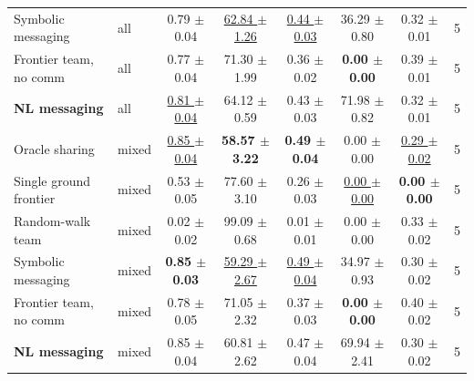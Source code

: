 \begin{tabular}{llcccccc}
Symbolic messaging & all & 0.79 $\pm$ 0.04 & \underline{62.84 $\pm$ 1.26} & \underline{0.44 $\pm$ 0.03} & 36.29 $\pm$ 0.80 & 0.32 $\pm$ 0.01 & 5 \\
Frontier team, no comm & all & 0.77 $\pm$ 0.04 & 71.30 $\pm$ 1.99 & 0.36 $\pm$ 0.02 & \textbf{0.00 $\pm$ 0.00} & 0.39 $\pm$ 0.01 & 5 \\
\textbf{NL messaging} & all & \underline{0.81 $\pm$ 0.04} & 64.12 $\pm$ 0.59 & 0.43 $\pm$ 0.03 & 71.98 $\pm$ 0.82 & 0.32 $\pm$ 0.01 & 5 \\
\midrule
Oracle sharing & mixed & \underline{0.85 $\pm$ 0.04} & \textbf{58.57 $\pm$ 3.22} & \textbf{0.49 $\pm$ 0.04} & 0.00 $\pm$ 0.00 & \underline{0.29 $\pm$ 0.02} & 5 \\
Single ground frontier & mixed & 0.53 $\pm$ 0.05 & 77.60 $\pm$ 3.10 & 0.26 $\pm$ 0.03 & \underline{0.00 $\pm$ 0.00} & \textbf{0.00 $\pm$ 0.00} & 5 \\
Random-walk team & mixed & 0.02 $\pm$ 0.02 & 99.09 $\pm$ 0.68 & 0.01 $\pm$ 0.01 & 0.00 $\pm$ 0.00 & 0.33 $\pm$ 0.02 & 5 \\
Symbolic messaging & mixed & \textbf{0.85 $\pm$ 0.03} & \underline{59.29 $\pm$ 2.67} & \underline{0.49 $\pm$ 0.04} & 34.97 $\pm$ 0.93 & 0.30 $\pm$ 0.02 & 5 \\
Frontier team, no comm & mixed & 0.78 $\pm$ 0.05 & 71.05 $\pm$ 2.32 & 0.37 $\pm$ 0.03 & \textbf{0.00 $\pm$ 0.00} & 0.40 $\pm$ 0.02 & 5 \\
\textbf{NL messaging} & mixed & 0.85 $\pm$ 0.04 & 60.81 $\pm$ 2.62 & 0.47 $\pm$ 0.04 & 69.94 $\pm$ 2.41 & 0.30 $\pm$ 0.02 & 5 \\
\bottomrule
\end{tabular}
